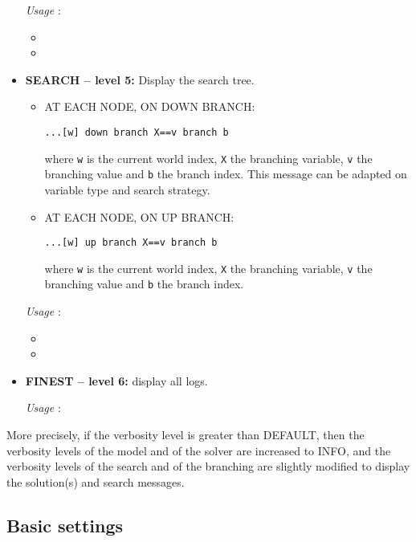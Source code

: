 \begin{itemize}
		\textit{Usage} : 
		\begin{itemize}
		\item {}
		\item {}
		\end{itemize}

	\item \textbf{SEARCH -- level 5:} Display the search tree.
		\begin{itemize}
			\item AT EACH NODE, ON DOWN BRANCH:
			\begin{lstlisting}
...[w] down branch X==v branch b
			\end{lstlisting}
where \texttt{w} is the current world index, \texttt{X} the branching variable, \texttt{v} the branching value and \texttt{b} the branch index. This message can be adapted on variable type and search strategy.

			\item AT EACH NODE, ON UP BRANCH:
			\begin{lstlisting}
...[w] up branch X==v branch b
			\end{lstlisting}
where \texttt{w} is the current world index, \texttt{X} the branching variable, \texttt{v} the branching value and \texttt{b} the branch index. 
		\end{itemize}
		
		\textit{Usage} : 
		\begin{itemize}
		\item {}
		\item {}
		\end{itemize}

	\item \textbf{FINEST -- level 6:} display all logs.
	
	\vspace{0.2cm} 
	\textit{Usage} :  

\end{itemize}

More precisely, if the verbosity level is greater than DEFAULT, then the verbosity levels of the model and of the solver are increased to INFO, and the verbosity levels of the search and of the branching are slightly modified to display the solution(s) and search messages.

\subsection{Basic settings}\label{solver:logbasicsettings}\hypertarget{solver:logbasicsettings}{}

